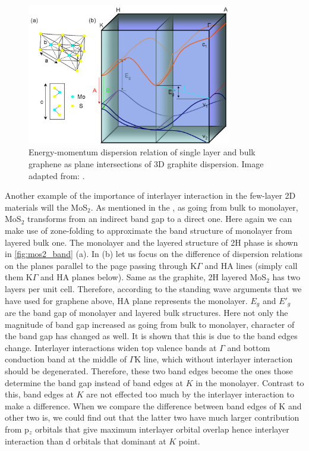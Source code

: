 \begin{figure}[htbp!] 
\centering  
\includegraphics[width=0.8\textwidth]{mos2_band.png}
\caption{Energy-momentum dispersion relation of single layer and bulk graphene as plane intersections of 3D graphite dispersion. Image adapted from: \cite{Mak2010b}. }  
\label{fig:mos2_band}
\end{figure} 

Another example of the importance of interlayer interaction in the few-layer 2D materials will the MoS$_2$. As mentioned in the , as going from bulk to monolayer, MoS$_2$ transforms from an indirect band gap to a direct one. Here again we can make use of zone-folding to approximate the band structure of monolayer from layered bulk one. The monolayer and the layered structure of 2H phase is shown in \autoref{fig:mos2_band} (a). In (b) let us focus on the difference of dispersion relations on the planes parallel to the page passing through K$\Gamma$ and HA lines (simply call them K$\Gamma$ and HA planes below). Same as the graphite, 2H layered MoS$_2$ has two layers per unit cell. Therefore, according to the standing wave arguments that we have used for graphene above, HA plane represents the monolayer. $E_g$ and $E\prime_g$ are the band gap of monolayer and layered bulk structures. Here not only the magnitude of band gap increased as going from bulk to monolayer, character of the band gap has changed as well. It is shown that this is due to the band edges change. Interlayer interactions widen top valence bands at $\Gamma$ and bottom conduction band at the middle of $\Gamma$K line, which without interlayer interaction should be degenerated. Therefore, these two band edges become the ones those determine the band gap instead of band edges at $K$ in the monolayer. Contrast to this, band edges at $K$ are not effected too much by the interlayer interaction to make a difference. When we compare the difference between band edges of K and other two is, we could find out that the latter two have much larger contribution from p$_z$ orbitals that give maximum interlayer orbital overlap hence interlayer interaction than d orbitals that dominant at $K$ point.


